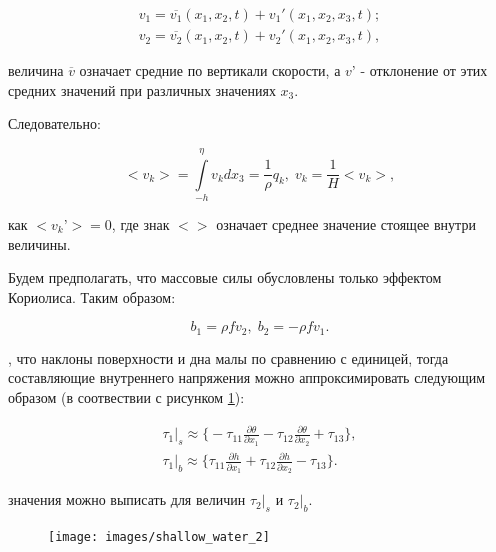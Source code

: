 \documentclass[14pt]{extreport}
\begin{document}
\begin{equation}\label{eq:shallow_water:13}
\begin{aligned}
v_1 = \overline{v_1} (x_1, x_2, t) + v_1'(x_1, x_2, x_3, t);\\
v_2 = \overline{v_2} (x_1, x_2, t) + v_2'(x_1, x_2, x_3, t),
\end{aligned}
\end{equation}

 величина $\overline{v}$ означает средние по вертикали скорости, а $v’$ - отклонение от этих средних значений при различных значениях $x_3$.

Следовательно:

\begin{equation}\label{eq:shallow_water:14}
<v_k>=\int\limits^\eta_{-h} v_k dx_3 = \frac{1}{\rho} q_k, \; v_k=\frac{1}{H}<v_k>,
\end{equation}

 как $<v_k’> = 0$, где знак $<>$ означает среднее значение стоящее внутри величины.

Будем предполагать, что массовые силы обусловлены только эффектом Кориолиса. Таким образом:

\begin{equation}\label{eq:shallow_water:15}
b_1 = \rho f v_2, \; b_2 = - \rho f v_1.
\end{equation}

, что наклоны поверхности и дна малы по сравнению с единицей, тогда составляющие внутреннего напряжения можно аппроксимировать следующим образом (в соотвествии с рисунком \ref{img:shallow_water:2}):

\begin{equation}\label{eq:shallow_water:16}
\begin{aligned}
 \tau_1\bigg|_s \approx \bigg\{ -\tau_{11}\frac{\partial \theta}{\partial x_1} -\tau_{12}\frac{\partial \theta}{\partial x_2} +\tau_{13}\bigg\}, \\
\tau_1\bigg|_b \approx \bigg\{ \tau_{11}\frac{\partial h}{\partial x_1} +\tau_{12}\frac{\partial h}{\partial x_2} -\tau_{13}\bigg\}.
\end{aligned}
\end{equation}

 значения можно выписать для величин $\tau_2|_s$ и $\tau_2|_b$.

\begin{figure}[H]
\centerline{
\texttt{[image: images/shallow\_water\_2]}}
\caption{}
\label{img:shallow_water:2}
\end{figure}
\end{document}
